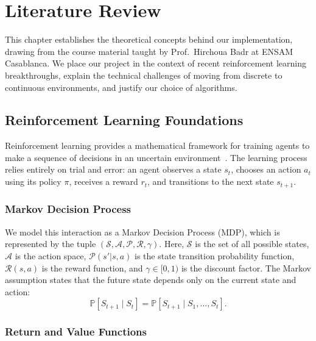 \chapter{Literature Review}
\label{ch:lit_rev}

This chapter establishes the theoretical concepts behind our implementation, drawing from the course material taught by Prof.\ Hirchoua Badr at ENSAM Casablanca. We place our project in the context of recent reinforcement learning breakthroughs, explain the technical challenges of moving from discrete to continuous environments, and justify our choice of algorithms.

\section{Reinforcement Learning Foundations}
\label{sec:lit_rl_foundations}

Reinforcement learning provides a mathematical framework for training agents to make a sequence of decisions in an uncertain environment~\citep{sutton2018reinforcement}. The learning process relies entirely on trial and error: an agent observes a state $s_t$, chooses an action $a_t$ using its policy $\pi$, receives a reward $r_t$, and transitions to the next state $s_{t+1}$. 

\subsection{Markov Decision Process}

We model this interaction as a Markov Decision Process (MDP), which is represented by the tuple $(\mathcal{S}, \mathcal{A}, \mathcal{P}, \mathcal{R}, \gamma)$. Here, $\mathcal{S}$ is the set of all possible states, $\mathcal{A}$ is the action space, $\mathcal{P}(s'|s,a)$ is the state transition probability function, $\mathcal{R}(s,a)$ is the reward function, and $\gamma \in [0,1)$ is the discount factor. The Markov assumption states that the future state depends only on the current state and action:
\begin{equation}
    \mathbb{P}[S_{t+1} \mid S_t] = \mathbb{P}[S_{t+1} \mid S_1, \ldots, S_t].
    \label{eq:markov}
\end{equation}

\subsection{Return and Value Functions}

